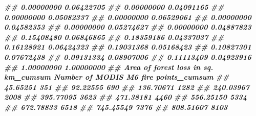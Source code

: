 \documentclass[10pt,landscape,a3paper]{article}
\newenvironment{Shaded}{\begin{snugshade}}{\end{snugshade}}
\newcommand{\DocumentationTok}[1]{\textcolor[rgb]{0.56,0.35,0.01}{\textbf{\textit{#1}}}}
\begin{document}
\begin{Shaded}
\begin{Highlighting}[]
\DocumentationTok{\#\#                          0.00000000                              0.06422705}
\DocumentationTok{\#\#                          0.00000000                              0.04091165}
\DocumentationTok{\#\#                          0.00000000                              0.05082337}
\DocumentationTok{\#\#                          0.00000000                              0.06529061}
\DocumentationTok{\#\#                          0.00000000                              0.04582353}
\DocumentationTok{\#\#                          0.00000000                              0.05274627}
\DocumentationTok{\#\#                          0.00000000                              0.04887823}
\DocumentationTok{\#\#                          0.15408480                              0.06846865}
\DocumentationTok{\#\#                          0.18359186                              0.04337037}
\DocumentationTok{\#\#                          0.16128921                              0.06424323}
\DocumentationTok{\#\#                          0.19031368                              0.05168423}
\DocumentationTok{\#\#                          0.10827301                              0.07672438}
\DocumentationTok{\#\#                          0.09131334                              0.08907006}
\DocumentationTok{\#\#                          0.11113409                              0.04923916}
\DocumentationTok{\#\#                          1.00000000                              1.00000000}
\DocumentationTok{\#\#  Area of forest loss in sq. km\_cumsum Number of MODIS M6 fire points\_cumsum}
\DocumentationTok{\#\#                              45.65251                                   351}
\DocumentationTok{\#\#                              92.22555                                   690}
\DocumentationTok{\#\#                             136.70671                                  1282}
\DocumentationTok{\#\#                             240.03967                                  2008}
\DocumentationTok{\#\#                             395.77095                                  3623}
\DocumentationTok{\#\#                             471.38181                                  4460}
\DocumentationTok{\#\#                             556.25150                                  5334}
\DocumentationTok{\#\#                             672.78833                                  6518}
\DocumentationTok{\#\#                             745.45549                                  7376}
\DocumentationTok{\#\#                             808.51607                                  8103}

\end{Highlighting}
\end{Shaded}
\end{document}
